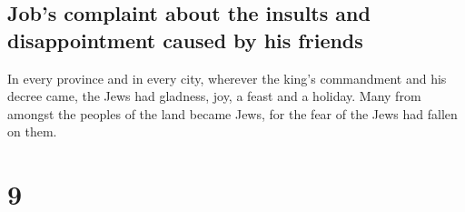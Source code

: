 \hypertarget{jobs-complaint-about-the-insults-and-disappointment-caused-by-his-friends}{%
\subsection{Job's complaint about the insults and disappointment caused
by his
friends}\label{jobs-complaint-about-the-insults-and-disappointment-caused-by-his-friends}}

 In every province and in every city, wherever the king's
commandment and his decree came, the Jews had gladness, joy, a feast and
a holiday. Many from amongst the peoples of the land became Jews, for
the fear of the Jews had fallen on them.

\hypertarget{section-8}{%
\section{9}\label{section-8}}

